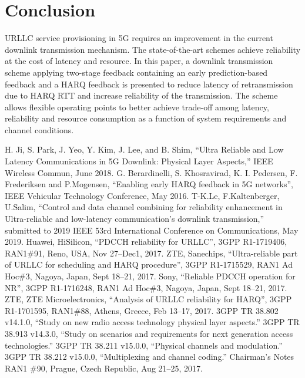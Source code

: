 \documentclass[conference]{IEEEtran}
\begin{document}
\section{Conclusion}

URLLC service provisioning in 5G requires an improvement in the current downlink transmission mechanism. The state-of-the-art schemes achieve reliability at the cost of latency and resource. In this paper, a downlink transmission scheme applying two-stage feedback containing an early prediction-based feedback and a HARQ feedback is presented to reduce latency of retransmission due to HARQ RTT and increase reliability of the transmission. The scheme allows flexible operating points to better achieve trade-off among latency, reliability and resource consumption as a function of system requirements and channel conditions.

\begin{thebibliography}{00}
 H. Ji, S. Park, J. Yeo, Y. Kim, J. Lee, and B. Shim, “Ultra Reliable and Low Latency Communications in 5G Downlink: Physical Layer Aspects,”  IEEE Wireless Commun, June 2018.
 G. Berardinelli, S. Khosravirad, K. I. Pedersen, F. Frederiksen and P.Mogensen, “Enabling early HARQ feedback in 5G networks”, IEEE Vehicular Technology Conference, May 2016.
 T-K.Le, F.Kaltenberger, U.Salim, ``Control and data channel combining for reliability enhancement in Ultra-reliable and low-latency communication's downlink transmission,'' submitted to 2019 IEEE 53rd International Conference on Communications, May 2019.
 Huawei, HiSilicon, ``PDCCH reliability for URLLC'', 3GPP R1-1719406, RAN1\#91, Reno, USA, Nov 27--Dec1, 2017.
 ZTE, Sanechips, ``Ultra-reliable part of URLLC for scheduling and HARQ procedure'', 3GPP R1-1715529, RAN1 Ad Hoc\#3, Nagoya, Japan, Sept 18--21, 2017.
 Sony, ``Reliable PDCCH operation for NR'', 3GPP R1-1716248, RAN1 Ad Hoc\#3, Nagoya, Japan, Sept 18--21, 2017.
 ZTE, ZTE Microelectronics, ``Analysis of URLLC reliability for HARQ'', 3GPP R1-1701595, RAN1\#88, Athens, Greece, Feb 13--17, 2017.
 3GPP TR 38.802 v14.1.0, ``Study on new radio access technology physical layer aspects.''
 3GPP TR 38.913 v14.3.0, ``Study on scenarios and requirements for next generation access technologies.''
 3GPP TR 38.211 v15.0.0, ``Physical channels and modulation.''
 3GPP TR 38.212 v15.0.0, ``Multiplexing and channel coding.''
 Chairman's Notes RAN1 \#90, Prague, Czech Republic, Aug 21--25, 2017.

\end{thebibliography}
\vspace{12pt}
\end{document}
